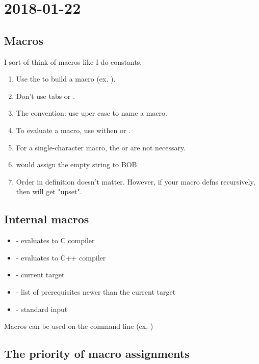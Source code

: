 \section{2018-01-22}

\subsection{Macros}

I sort of think of macros like I do constants.

\begin{enumerate}
  \item Use the \shellcmd{=} to build a macro (ex. ).
  \item Don't use tabs or \shellcmd{:}.
  \item The convention: use uper case to name a macro.
  \item To evaluate a macro, use withen \shellcmd{\$\{----\}} or \shellcmd{\$(----)}.
  \item For a single-character macro, the \shellcmd{\{\}} or \shellcmd{()} are not necessary.
  \item {} would assign the empty string to BOB
  \item Order in definition doesn't matter. However, if your macro defns recursively, then  will get "upset".
\end{enumerate}

\subsection{Internal macros}

\begin{itemize}
  \item {} - evaluates to C compiler
  \item {} - evaluates to C++ compiler
  \item {} - current target
  \item {} - list of prerequisites newer than the current target
  \item \shellcmd{\$<} - standard input
\end{itemize}

Macros can be used on the command line (ex. )

\subsection{The priority of macro assignments}
 
